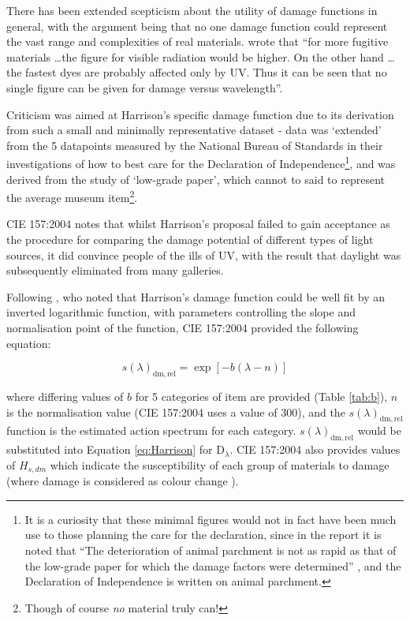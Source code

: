 There has been extended scepticism about the utility of damage functions in general, with the argument being that no one damage function could represent the vast range and complexities of real materials. \citet[p. 178]{thomson_museum_1978} wrote that ``for more fugitive materials \dots the figure for visible radiation would be higher. On the other hand \dots the fastest dyes are probably affected only by UV. Thus it can be seen that no single figure can be given for damage versus wavelength''.

Criticism was aimed at Harrison's specific damage function due to its derivation from such a small and minimally representative dataset - data was `extended' from the 5 datapoints measured by the National Bureau of Standards \citep{national_bureau_of_standards_preservation_1951} in their investigations of how to best care for the Declaration of Independence\footnote{It is a curiosity that these minimal figures would not in fact have been much use to those planning the care for the declaration, since in the report it is noted that ``The deterioration of animal parchment is not as rapid as that of the low-grade paper for which the damage factors were determined'' \citep{national_bureau_of_standards_preservation_1951}, and the Declaration of Independence is written on animal parchment.}, and was derived from the study of `low-grade paper', which cannot to said to represent the average museum item\footnote{Though of course \emph{no} material truly can!}.

\gls{CIE} 157:2004 \citep{cie_cie_2004} notes that whilst Harrison's proposal failed to gain acceptance as the procedure for comparing the damage potential of different types of light sources, it did convince people of the ills of \gls{UV}, with the result that daylight was subsequently eliminated from many galleries.

Following \citet{cuttle_lighting_1988}, who noted that Harrison's damage function could be well fit by an inverted logarithmic function, with parameters controlling the slope and normalisation point of the function, \gls{CIE} 157:2004 provided the following equation:

\begin{equation}
    s(\lambda)_{\mathrm{dm,rel}}=\exp [-b(\lambda-n)]
    \label{eq:damfac}
\end{equation}

where differing values of $b$ for 5 categories of item are provided (Table \ref{tab:b}), $n$ is the normalisation value (\gls{CIE} 157:2004 uses a value of 300), and the $s(\lambda)_{\mathrm{dm,rel}}$ function is the estimated action spectrum for each category. $s(\lambda)_{\mathrm{dm,rel}}$ would be substituted into Equation \ref{eq:Harrison} for $\mathrm{D}_{\lambda}$. \gls{CIE} 157:2004 also provides values of $H_{s,dm}$ which indicate the susceptibility of each group of materials to damage (where damage is considered as colour change%
).


